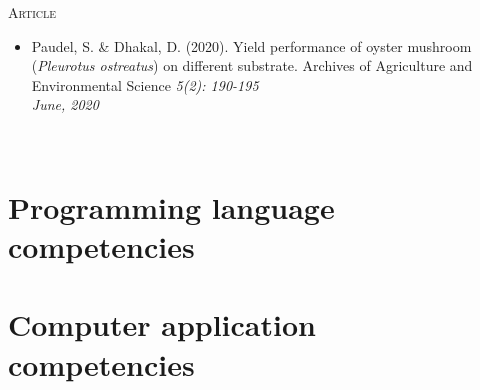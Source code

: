\documentclass[11pt,a4paper,sans]{moderncv}
\begin{document}
\begin{minipage}[t]{.15\textwidth}
\hfill \textsc{Article}
\end{minipage}
\hfill\vline\hfill
\begin{minipage}[t]{.80\textwidth}
\begin{itemize}
\item{
Paudel, S. \& Dhakal, D. (2020). Yield performance of oyster mushroom (\textit{Pleurotus ostreatus}) on different substrate. Archives of Agriculture and Environmental Science \textit{5(2): 190-195} \\
\textit{June, 2020}}
\end{itemize}

\end{minipage}\\
\vspace{.15cm}


\section{Programming language competencies}

\section{Computer application competencies}

\end{document}
